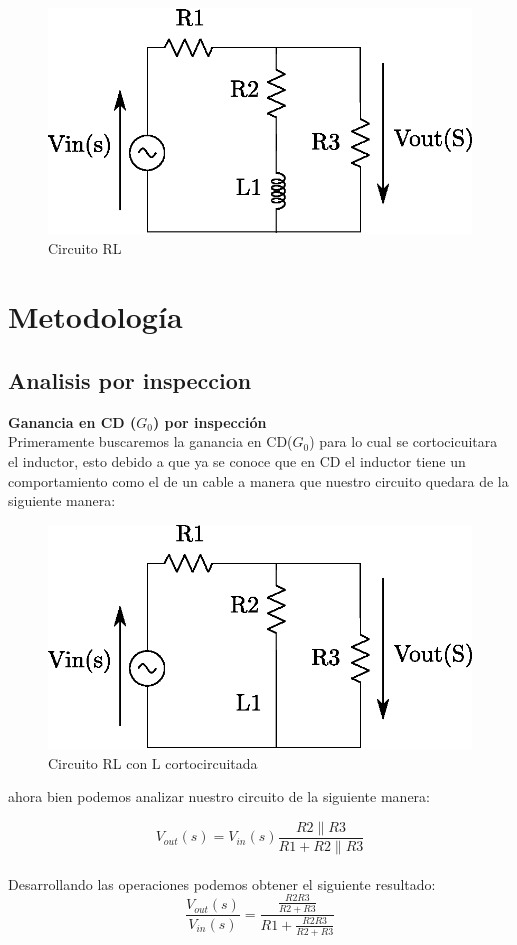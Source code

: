 \documentclass[12pt,letterpaper]{IEEEtran}
\begin{document}
	\begin{figure}[h!]
		\centering
		\includegraphics[width=0.7\linewidth]{Circuito}
		\caption{Circuito RL }
		\label{fig:circuito}
	\end{figure}
	
	\section{Metodología}
	\subsection{Analisis por inspeccion}
	\textbf{Ganancia en CD ($G_{0}$) por inspección}\\
	
	
	Primeramente buscaremos la ganancia en CD($G_{0}$) para lo cual se cortocicuitara el inductor, esto debido a que ya se conoce que en CD el inductor tiene un comportamiento  como el de un cable a manera que nuestro circuito quedara de la siguiente manera:
	
	\begin{figure}[h!]
		\centering
		\includegraphics[width=0.7\linewidth]{Circuito2}
		\caption{Circuito RL con L cortocircuitada}
		\label{fig:circuito2}
	\end{figure}
	
	ahora bien podemos analizar nuestro circuito de la siguiente manera:
	
	$$V_{out}(s)=V_{in}(s)\frac{R2\parallel R3}{R1+R2\parallel R3}$$\\
	Desarrollando las operaciones podemos obtener el siguiente resultado:
	$$\frac{V_{out}(s)}{V_{in}(s)}=\frac{\frac{R2 R3}{R2+R3}}{R1+\frac{R2 R3}{R2+R3}}$$
	
\end{document}
